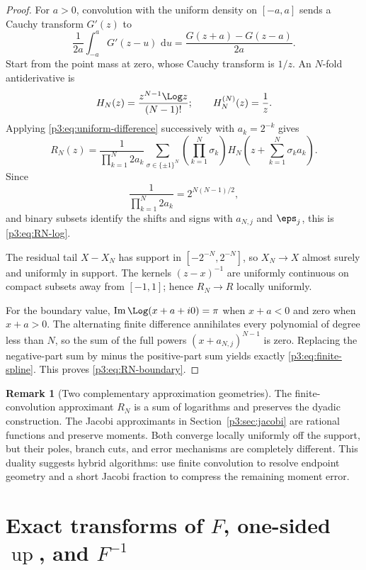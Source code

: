 \documentclass[11pt,oneside]{article}
\theoremstyle{definition}
\newtheorem{remark}[theorem]{Remark}
\newcommand{\dd}{\,\mathrm d}
\newcommand{\Up}{\operatorname{up}}
\begin{document}
\begin{proof}
For \(a>0\), convolution with the uniform density on \([-a,a]\) sends a Cauchy transform
\(G'(z)\) to
\begin{equation}
 \frac1{2a}\int_{-a}^{a}G'(z-u)\,\dd u
 =\frac{G(z+a)-G(z-a)}{2a}.                                  \label{p3:eq:uniform-difference}
\end{equation}
Start from the point mass at zero, whose Cauchy transform is \(1/z\).  An \(N\)-fold
antiderivative is
\[
 H_N(z)=\frac{z^{N-1}\Log z}{(N-1)!};
 \qquad H_N^{(N)}(z)=\frac1z.
\]
Applying \eqref{p3:eq:uniform-difference} successively with \(a_k=2^{-k}\) gives
\[
 R_N(z)=\frac{1}{\prod_{k=1}^{N}2a_k}
 \sum_{\sigma\in\{\pm1\}^N}
 \left(\prod_{k=1}^{N}\sigma_k\right)
 H_N\!\left(z+\sum_{k=1}^{N}\sigma_k a_k\right).
\]
Since
\[
 \frac1{\prod_{k=1}^{N}2a_k}=2^{N(N-1)/2},
\]
and binary subsets identify the shifts and signs with \(a_{N,j}\) and \(\eps_j\), this is
\eqref{p3:eq:RN-log}.

The residual tail \(X-X_N\) has support in \([-2^{-N},2^{-N}]\), so \(X_N\to X\)
almost surely and uniformly in support.  The kernels \((z-x)^{-1}\) are uniformly
continuous on compact subsets away from \([-1,1]\); hence \(R_N\to R\) locally uniformly.

For the boundary value, \(\operatorname{Im}\Log(x+a+i0)=\pi\) when \(x+a<0\) and zero
when \(x+a>0\).  The alternating finite difference annihilates every polynomial of degree
less than \(N\), so the sum of the full powers \((x+a_{N,j})^{N-1}\) is zero.  Replacing the
negative-part sum by minus the positive-part sum yields exactly
\eqref{p3:eq:finite-spline}.  This proves \eqref{p3:eq:RN-boundary}.
\end{proof}

\begin{remark}[Two complementary approximation geometries]
The finite-convolution approximant \(R_N\) is a sum of logarithms and preserves the dyadic
construction.  The Jacobi approximants in Section~\ref{p3:sec:jacobi} are rational functions
and preserve moments.  Both converge locally uniformly off the support, but their poles,
branch cuts, and error mechanisms are completely different.  This duality suggests hybrid
algorithms: use finite convolution to resolve endpoint geometry and a short Jacobi fraction
to compress the remaining moment error.
\end{remark}

\section{Exact transforms of \(F\), one-sided \(\Up\), and \(F^{-1}\)}\label{p3:sec:fabius-transforms}
\end{document}

